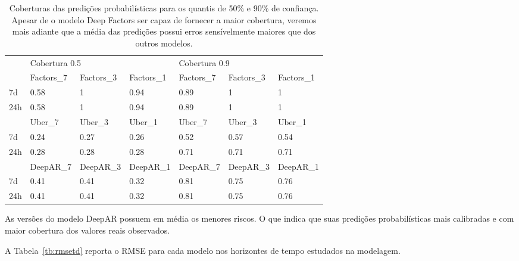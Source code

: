 \begin{center}
\begin{table}
  \begin{tabular}{l|l|l|l|l|l|l|}
    \cline{2-7}
    & \multicolumn{3}{l|}{Cobertura 0.5}                       & \multicolumn{3}{l|}{Cobertura 0.9}                       \\ \cline{2-7} 
    & Factors\_7 & Factors\_3 & Factors\_1 & Factors\_7 & Factors\_3 & Factors\_1 \\ \hline
    \multicolumn{1}{|l|}{7d}  & 0.58           & 1           & 0.94           & 0.89           & 1          & 1           \\ \hline
    \multicolumn{1}{|l|}{24h} & 0.58           & 1           & 0.94           & 0.89           & 1          & 1           \\ \hline
    & Uber\_7 & Uber\_3 & Uber\_1 & Uber\_7 & Uber\_3 & Uber\_1 \\ \hline
    \multicolumn{1}{|l|}{7d}  & 0.24    & 0.27    & 0.26    & 0.52    & 0.57   & 0.54    \\ \hline
    \multicolumn{1}{|l|}{24h} & 0.28    & 0.28    & 0.28    & 0.71   & 0.71   & 0.71    \\ \hline
    & DeepAR\_7 & DeepAR\_3 & DeepAR\_1 & DeepAR\_7 & DeepAR\_3 & DeepAR\_1 \\ \hline
    \multicolumn{1}{|l|}{7d}  & 0.41     & 0.41     & 0.32     & 0.81     & 0.75     & 0.76     \\ \hline
    \multicolumn{1}{|l|}{24h} &  0.41     & 0.41     & 0.32     & 0.81     & 0.75     & 0.76     \\ \hline
  \end{tabular}
  \caption{Coberturas das predições probabilísticas para os quantis de 50\% e
    90\% de confiança. Apesar de o modelo Deep Factors ser capaz de fornecer a
    maior cobertura, veremos mais adiante que a média das predições possui erros
  sensívelmente maiores que dos outros modelos.}
  \label{tb:cobs}
\end{table}
\end{center}

As versões do modelo DeepAR possuem em média os menores riscos. O que indica que
suas predições probabilísticas mais calibradas e com maior cobertura dos valores
reais observados.


A Tabela~\ref{tb:rmsetd} reporta o RMSE para cada modelo nos horizontes de tempo
estudados na modelagem.


